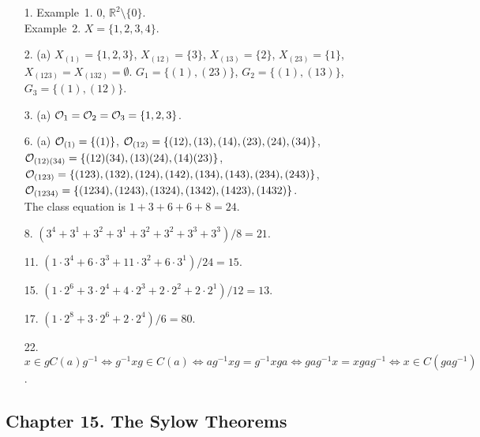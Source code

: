 {\small
\begin{itemize}
 
\item[1.] 
Example~1. $0$, ${\mathbb R}^2 \setminus \{ 0 \}$. \\
Example~2. $X = \{ 1, 2, 3, 4 \}$.
 
\item[2.]
(a) $X_{(1)} = \{1, 2, 3  \}$, $X_{(12)} = \{3 \}$, $X_{(13)}=
\{ 2 \}$, $X_{(23)} = \{1 \}$, $X_{(123)} = X_{(132)} = \emptyset$.
$G_1 = \{ (1), (23) \}$, $G_2 = \{(1), (13) \}$, $G_3 = \{ (1),
(12)\}$.
 
\item[3.]
(a) 
${\cal O}_1 = {\cal O}_2 = {\cal O}_3 = \{ 1, 2, 3\}$.
 
 
\item[6.]
(a)
${\cal O}_{(1)} = \{ (1) \}$, 
${\cal O}_{(12)} = \{ (12), (13), (14), (23), (24), (34) \}$, \\
${\cal O}_{(12)(34)} = \{ (12)(34), (13)(24), (14)(23) \}$, \\
${\cal O}_{(123)} = \{ (123), (132), (124), (142), (134), (143),
(234), (243) \}$,  \\
${\cal O}_{(1234)} = \{ (1234), (1243), (1324), (1342), (1423), (1432)
\}$. \\
The class equation is $1 + 3 + 6 + 6 + 8 = 24$.
 
\item[8.]
$(3^4 + 3^1 + 3^2 + 3^1 + 3^2 + 3^2 + 3^3 + 3^3)/8 = 21$.
 
\item[11.]
$(1 \cdot 3^4 + 6 \cdot 3^3 + 11 \cdot 3^2 + 6 \cdot 3^1)/24 = 15$.
 
\item[15.]
$(1 \cdot 2^6 + 3 \cdot 2^4 + 4 \cdot 2^3 + 2 \cdot 2^2 
+ 2 \cdot 2^1)/12 = 13$.
 
\item[17.]
$(1 \cdot 2^8 + 3 \cdot 2^6 + 2 \cdot 2^4)/6 = 80$.
 
 
\item[22.]
$x \in g C(a) g^{-1} \Longleftrightarrow g^{-1}x g \in C(a) \Longleftrightarrow
a g^{-1} x g = g^{-1} x g a \Longleftrightarrow g a g^{-1} x = x g a
g^{-1} \Longleftrightarrow x \in C(gag^{-1})$. 
 
\end{itemize}
}
 
\subsection*{Chapter 15. The Sylow Theorems}
 
